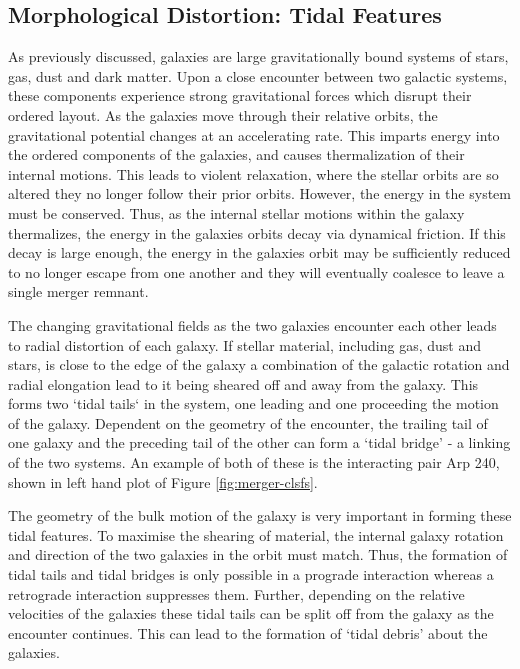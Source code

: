 \subsection{Morphological Distortion: Tidal Features}
\noindent As previously discussed, galaxies are large gravitationally bound systems of stars, gas, dust and dark matter. Upon a close encounter between two galactic systems, these components experience strong gravitational forces which disrupt their ordered layout. As the galaxies move through their relative orbits, the gravitational potential changes at an accelerating rate. This imparts energy into the ordered components of the galaxies, and causes thermalization of their internal motions. This leads to violent relaxation, where the stellar orbits are so altered they no longer follow their prior orbits. However, the energy in the system must be conserved. Thus, as the internal stellar motions within the galaxy thermalizes, the energy in the galaxies orbits decay via dynamical friction. If this decay is large enough, the energy in the galaxies orbit may be sufficiently reduced to no longer escape from one another and they will eventually coalesce to leave a single merger remnant. 

The changing gravitational fields as the two galaxies encounter each other leads to radial distortion of each galaxy. If stellar material, including gas, dust and stars, is close to the edge of the galaxy a combination of the galactic rotation and radial elongation lead to it being sheared off and away from the galaxy. This forms two `tidal tails` in the system, one leading and one proceeding the motion of the galaxy. Dependent on the geometry of the encounter, the trailing tail of one galaxy and the preceding tail of the other can form a `tidal bridge' - a linking of the two systems. An example of both of these is the interacting pair Arp 240, shown in left hand plot of Figure \ref{fig:merger-clsfs}. 

The geometry of the bulk motion of the galaxy is very important in forming these tidal features. To maximise the shearing of material, the internal galaxy rotation and direction of the two galaxies in the orbit must match. Thus, the formation of tidal tails and tidal bridges is only possible in a prograde interaction whereas a retrograde interaction suppresses them. Further, depending on the relative velocities of the galaxies these tidal tails can be split off from the galaxy as the encounter continues. This can lead to the formation of `tidal debris' about the galaxies.

